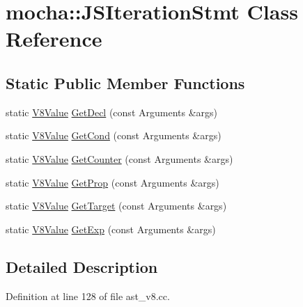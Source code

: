 \hypertarget{classmocha_1_1_j_s_iteration_stmt}{
\section{mocha::JSIterationStmt Class Reference}
\label{classmocha_1_1_j_s_iteration_stmt}
}
\subsection*{Static Public Member Functions}
\begin{DoxyCompactItemize}
\item 
static \hyperlink{namespacemocha_a22eca0d76f439fca2a26cae77eb6ade4}{V8Value} \hyperlink{classmocha_1_1_j_s_iteration_stmt_a61d3d6123527376ba8b7d274ec523d1e}{GetDecl} (const Arguments \&args)
\item 
static \hyperlink{namespacemocha_a22eca0d76f439fca2a26cae77eb6ade4}{V8Value} \hyperlink{classmocha_1_1_j_s_iteration_stmt_a6823d9484663af4f3fdb7b89b8a26fcb}{GetCond} (const Arguments \&args)
\item 
static \hyperlink{namespacemocha_a22eca0d76f439fca2a26cae77eb6ade4}{V8Value} \hyperlink{classmocha_1_1_j_s_iteration_stmt_af01095d3289b65818e7111ac5648c377}{GetCounter} (const Arguments \&args)
\item 
static \hyperlink{namespacemocha_a22eca0d76f439fca2a26cae77eb6ade4}{V8Value} \hyperlink{classmocha_1_1_j_s_iteration_stmt_a5a6ef6f90efb164d108e656dc530193a}{GetProp} (const Arguments \&args)
\item 
static \hyperlink{namespacemocha_a22eca0d76f439fca2a26cae77eb6ade4}{V8Value} \hyperlink{classmocha_1_1_j_s_iteration_stmt_a87ae8f0d5fdf8d4d534fdea8c2d096ff}{GetTarget} (const Arguments \&args)
\item 
static \hyperlink{namespacemocha_a22eca0d76f439fca2a26cae77eb6ade4}{V8Value} \hyperlink{classmocha_1_1_j_s_iteration_stmt_a07e2ca0396e61c189532543e128b62d6}{GetExp} (const Arguments \&args)
\end{DoxyCompactItemize}


\subsection{Detailed Description}


Definition at line 128 of file ast\_\-v8.cc.



